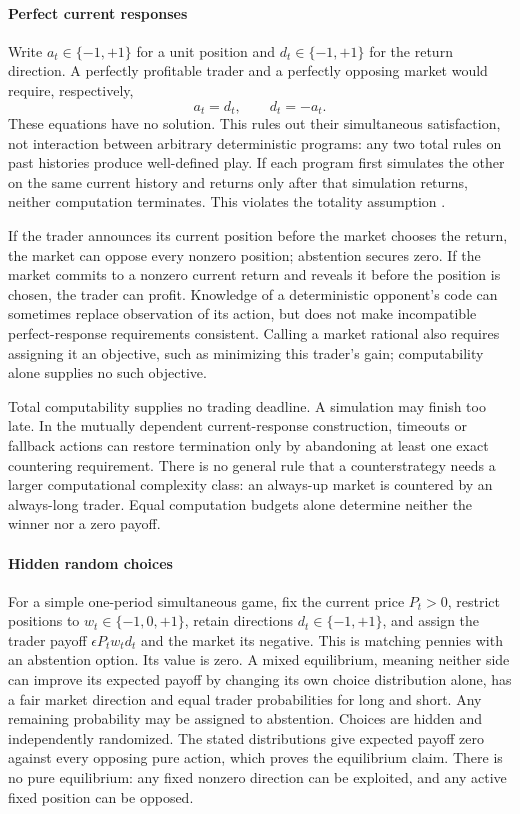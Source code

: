 \documentclass[aps,pra,reprint,superscriptaddress,amsmath,amssymb,floatfix]{revtex4-2}
\theoremstyle{plain}
\theoremstyle{definition}
\theoremstyle{remark}
\begin{document}
\paragraph{Perfect current responses}

Write \(a_t\in\{-1,+1\}\) for a unit position and
\(d_t\in\{-1,+1\}\) for the return direction.
A perfectly profitable trader and a perfectly opposing market would require,
respectively,
\[
  a_t=d_t,\qquad d_t=-a_t.
\]
These equations have no solution. This rules out their simultaneous
satisfaction, not interaction between arbitrary deterministic programs:
any two total rules on past histories produce well-defined play.
If each program first simulates the other on the same current history and
returns only after that simulation returns, neither computation terminates.
This violates the totality assumption
\cite{FallensteinTaylorChristiano2015}.

If the trader announces its current position before the market chooses the
return, the market can oppose every nonzero position; abstention secures zero.
If the market commits to a nonzero current return and reveals it before the
position is chosen, the trader can profit. Knowledge of a deterministic
opponent's code can sometimes replace observation of its action, but does not
make incompatible perfect-response requirements consistent.
Calling a market rational also requires assigning it an objective, such as
minimizing this trader's gain; computability alone supplies no such objective.

Total computability supplies no trading deadline. A simulation may finish
too late. In the mutually dependent current-response construction, timeouts
or fallback actions can restore termination only by abandoning at least one
exact countering requirement. There is no general rule that a counterstrategy needs
a larger computational complexity class: an always-up market is countered
by an always-long trader. Equal computation budgets alone determine neither
the winner nor a zero payoff.

\paragraph{Hidden random choices}

For a simple one-period simultaneous game, fix the current price \(P_t>0\),
restrict positions to \(w_t\in\{-1,0,+1\}\), retain directions
\(d_t\in\{-1,+1\}\), and assign the trader payoff
\(\epsilon P_tw_td_t\) and the market its negative.
This is matching pennies with an abstention option. Its value is zero.
A mixed equilibrium, meaning neither side can improve its expected payoff
by changing its own choice distribution alone, has a fair market direction
and equal trader probabilities for long and short. Any remaining probability
may be assigned to abstention. Choices are hidden and independently
randomized. The stated distributions give expected payoff zero against every
opposing pure action, which proves the equilibrium claim.
There is no pure equilibrium: any fixed nonzero direction can be exploited,
and any active fixed position can be opposed.
\end{document}

